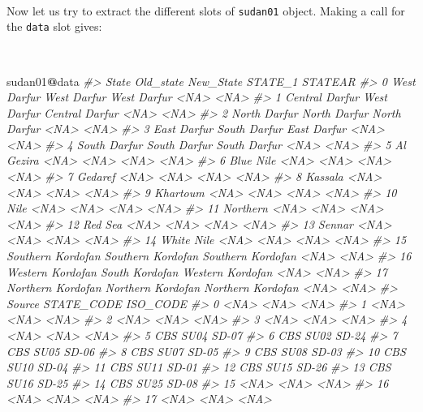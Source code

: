 \documentclass[12pt,a4paper,a4paper]{book}
\newenvironment{Shaded}{\begin{snugshade}}{\end{snugshade}}
\newcommand{\CommentTok}[1]{\textcolor[rgb]{0.56,0.35,0.01}{\textit{#1}}}
\newcommand{\OperatorTok}[1]{\textcolor[rgb]{0.81,0.36,0.00}{\textbf{#1}}}
\newcommand{\NormalTok}[1]{#1}
\theoremstyle{definition}
\theoremstyle{definition}
\theoremstyle{definition}
\theoremstyle{remark}
\begin{document}
~

Now let us try to extract the different slots of \texttt{sudan01}
object. Making a call for the \texttt{data} slot gives:

~

\begin{Shaded}
\begin{Highlighting}[]
\NormalTok{sudan01}\OperatorTok{@}\NormalTok{data}
\CommentTok{#>                State         Old_state         New_State STATE_1 STATEAR}
\CommentTok{#> 0        West Darfur       West Darfur       West Darfur    <NA>    <NA>}
\CommentTok{#> 1     Central Darfur       West Darfur    Central Darfur    <NA>    <NA>}
\CommentTok{#> 2       North Darfur      North Darfur      North Darfur    <NA>    <NA>}
\CommentTok{#> 3        East Darfur      South Darfur       East Darfur    <NA>    <NA>}
\CommentTok{#> 4       South Darfur      South Darfur      South Darfur    <NA>    <NA>}
\CommentTok{#> 5          Al Gezira              <NA>              <NA>    <NA>    <NA>}
\CommentTok{#> 6          Blue Nile              <NA>              <NA>    <NA>    <NA>}
\CommentTok{#> 7            Gedaref              <NA>              <NA>    <NA>    <NA>}
\CommentTok{#> 8            Kassala              <NA>              <NA>    <NA>    <NA>}
\CommentTok{#> 9           Khartoum              <NA>              <NA>    <NA>    <NA>}
\CommentTok{#> 10              Nile              <NA>              <NA>    <NA>    <NA>}
\CommentTok{#> 11          Northern              <NA>              <NA>    <NA>    <NA>}
\CommentTok{#> 12           Red Sea              <NA>              <NA>    <NA>    <NA>}
\CommentTok{#> 13            Sennar              <NA>              <NA>    <NA>    <NA>}
\CommentTok{#> 14        White Nile              <NA>              <NA>    <NA>    <NA>}
\CommentTok{#> 15 Southern Kordofan Southern Kordofan Southern Kordofan    <NA>    <NA>}
\CommentTok{#> 16  Western Kordofan    South Kordofan  Western Kordofan    <NA>    <NA>}
\CommentTok{#> 17 Northern Kordofan Northern Kordofan Northern Kordofan    <NA>    <NA>}
\CommentTok{#>    Source STATE_CODE ISO_CODE}
\CommentTok{#> 0    <NA>       <NA>     <NA>}
\CommentTok{#> 1    <NA>       <NA>     <NA>}
\CommentTok{#> 2    <NA>       <NA>     <NA>}
\CommentTok{#> 3    <NA>       <NA>     <NA>}
\CommentTok{#> 4    <NA>       <NA>     <NA>}
\CommentTok{#> 5     CBS       SU04    SD-07}
\CommentTok{#> 6     CBS       SU02    SD-24}
\CommentTok{#> 7     CBS       SU05    SD-06}
\CommentTok{#> 8     CBS       SU07    SD-05}
\CommentTok{#> 9     CBS       SU08    SD-03}
\CommentTok{#> 10    CBS       SU10    SD-04}
\CommentTok{#> 11    CBS       SU11    SD-01}
\CommentTok{#> 12    CBS       SU15    SD-26}
\CommentTok{#> 13    CBS       SU16    SD-25}
\CommentTok{#> 14    CBS       SU25    SD-08}
\CommentTok{#> 15   <NA>       <NA>     <NA>}
\CommentTok{#> 16   <NA>       <NA>     <NA>}
\CommentTok{#> 17   <NA>       <NA>     <NA>}
\end{Highlighting}
\end{Shaded}
\end{document}
